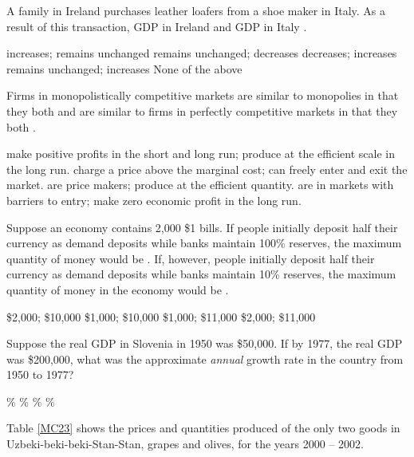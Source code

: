 \documentclass[addpoints,11pt]{exam}
\theoremstyle{definition}
\newcommand{\blank}[0]{\underline{\hspace{3cm}}}
\begin{document}
\begin{questions}
	\question A family in Ireland purchases leather loafers from a shoe maker in Italy. As a result of this transaction, GDP in Ireland \blank and GDP in Italy \blank. 
	
	\begin{choices}
		\choice increases; remains unchanged
		\choice remains unchanged; decreases
		\choice decreases; increases
		\CorrectChoice remains unchanged; increases
		\choice None of the above
	\end{choices}
	

		
	\question Firms in monopolistically competitive markets are similar to monopolies in that they both \blank and are similar to firms in perfectly competitive markets in that they both \blank.
	

		\begin{choices}
				\choice make positive profits in the short and long run; produce at the efficient scale in the long run.
				\CorrectChoice charge a price above the marginal cost; can freely enter and exit the market.
				\choice are price makers; produce at the efficient quantity.
				\choice are in markets with barriers to entry; make zero economic profit in the long run.
		\end{choices}	

	
	\question Suppose an economy contains 2,000 \$1 bills. If people initially deposit half their currency as demand deposits while banks maintain 100\% reserves, the maximum quantity of money would be \blank. If, however, people initially deposit half their currency as demand deposits while banks maintain 10\% reserves, the maximum quantity of money in the economy would be \blank.
	
	\begin{choices}
		\choice \$2,000; \$10,000
		\choice \$1,000; \$10,000
		\choice \$1,000; \$11,000
		\CorrectChoice \$2,000; \$11,000
	\end{choices}
	

\question Suppose the real GDP in Slovenia in 1950 was \$50,000. If by 1977, the real GDP was \$200,000, what was the approximate \textit{annual} growth rate in the country from 1950 to 1977?


\begin{choices}
		\choice 2.6\%
		\choice 300\%
		\choice 4.0\%
		\CorrectChoice 5.2\%
\end{choices}


	
\question Table \ref{MC23} shows the prices and quantities produced of the only two goods in Uzbeki-beki-beki-Stan-Stan, grapes and olives, for the years 2000 -- 2002.


\end{questions}
\end{document}
